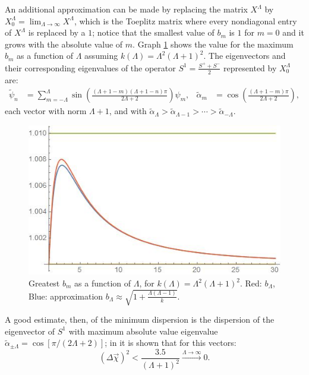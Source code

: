 An additional approximation can be made by replacing the matrix $X^\Lambda$ by $X^\Lambda_0 = \lim_{\Lambda \to \infty} X^\Lambda$, which is the Toeplitz matrix where every nondiagonal entry of $X^\Lambda$ is replaced by a $1$; notice that the smallest value of $b_m$ is $1$ for $m = 0$ and it grows with the absolute value of $m$. Graph \ref{fig:bn} shows the value for the maximum $b_m$ as a function of $\Lambda$ assuming $k(\Lambda) = \Lambda^2(\Lambda+1)^2$. The eigenvectors and their corresponding eigenvalues of the operator $S^1 = \frac{S^+ + S^-}{2}$ represented by $X^\Lambda_0$ are:
\begin{align}
    \tilde \psi_{n} &= \sum_{m = -\Lambda}^\Lambda \sin{\left(\frac{(\Lambda + 1-m)(\Lambda + 1-n)\pi}{2\Lambda + 2}\right)} \psi_m,&
    \tilde \alpha_m &= \cos{\left(\frac{(\Lambda + 1-m)\pi}{2\Lambda + 2}\right)},
\end{align}
each vector with norm $\Lambda + 1$, and with $\tilde \alpha_{\Lambda} > \tilde \alpha_{\Lambda-1} > \cdots > \tilde \alpha_{-\Lambda} $.

\begin{figure}
    \centering
    \includegraphics[width = 2\textwidth/3]{images/bn.jpg}
    \caption{Greatest $b_m$ as a function of $\Lambda$, for $k(\Lambda) = \Lambda^2(\Lambda+1)^2$. Red: $b_\Lambda$, Blue: approximation $b_\Lambda \approx \sqrt{1 + \frac{\Lambda(\Lambda - 1)}{k}}$. }
    \label{fig:bn}
\end{figure}

A good estimate, then, of the minimum dispersion is the dispersion of the eigenvector of $S^1$ with maximum absolute value eigenvalue $\tilde \alpha_{\pm \Lambda} = \cos{[\pi/(2\Lambda+2)]}$; in \cite{FioreCoherent2020} it is shown that for this vectors:
\begin{equation}
    (\Delta \vec \chi)^2 < \frac{3.5}{(\Lambda+1)^2} \overset{\Lambda \to \infty}{\longrightarrow} 0.
\end{equation}

